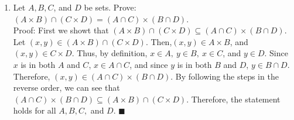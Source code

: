 \documentclass[12pt]{article}
\newcommand{\qed}{\(\blacksquare\)}
\begin{document}
\begin{enumerate}
        \item Let \(A, B, C\), and \(D\) be sets. Prove: \((A\times B)\cap(C\times D) = (A\cap C)\times (B\cap D)\).\\ Proof: First we showt that \((A\times B)\cap(C\times D)\subseteq (A\cap C)\times (B\cap D)\). Let \((x,y)\in (A\times B)\cap (C\times D)\). Then,\((x,y)\in A\times B\), and \((x,y)\in C\times D\). Thus, by definition, \(x\in A,\ y\in B,\ x\in C\), and \(y\in D\). Since \(x\) is in both \(A\) and \(C\), \(x\in A\cap C\), and since \(y\) is in both \(B\) and \(D\), \(y\in B\cap D\). Therefore, \((x,y)\in(A\cap C)\times(B\cap D)\). By following the steps in the reverse order, we can see that \((A\cap C)\times (B\cap D)\subseteq (A\times B)\cap(C\times D)\). Therefore, the statement holds for all \(A, B, C,\) and \(D\). \qed
    \end{enumerate}
\end{document}

